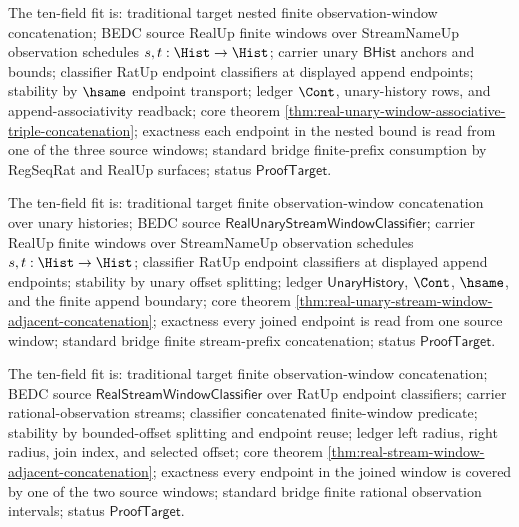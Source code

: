 The ten-field fit is: traditional target nested finite observation-window
concatenation; BEDC source RealUp finite windows over StreamNameUp observation
schedules $s,t:\Hist\to\Hist$; carrier unary $\mathsf{BHist}$ anchors and
bounds; classifier RatUp endpoint classifiers at displayed append endpoints;
stability by $\hsame$ endpoint transport; ledger $\Cont$, unary-history rows,
and append-associativity readback; core theorem
\autoref{thm:real-unary-window-associative-triple-concatenation}; exactness each
endpoint in the nested bound is read from one of the three source windows;
standard bridge finite-prefix consumption by RegSeqRat and RealUp surfaces;
status $\mathsf{ProofTarget}$.

The ten-field fit is: traditional target finite observation-window
concatenation over unary histories; BEDC source
$\mathsf{RealUnaryStreamWindowClassifier}$; carrier RealUp finite windows over
StreamNameUp observation schedules $s,t:\Hist\to\Hist$; classifier RatUp
endpoint classifiers at displayed append endpoints; stability by unary offset
splitting; ledger $\mathsf{UnaryHistory}$, $\Cont$, $\hsame$, and the finite
append boundary; core theorem
\autoref{thm:real-unary-stream-window-adjacent-concatenation}; exactness every
joined endpoint is read from one source window; standard bridge finite
stream-prefix concatenation; status $\mathsf{ProofTarget}$.

The ten-field fit is: traditional target finite observation-window
concatenation; BEDC source $\mathsf{RealStreamWindowClassifier}$ over RatUp
endpoint classifiers; carrier rational-observation streams; classifier
concatenated finite-window predicate; stability by bounded-offset splitting and
endpoint reuse; ledger left radius, right radius, join index, and selected
offset; core theorem
\autoref{thm:real-stream-window-adjacent-concatenation}; exactness every
endpoint in the joined window is covered by one of the two source windows;
standard bridge finite rational observation intervals; status
$\mathsf{ProofTarget}$.
